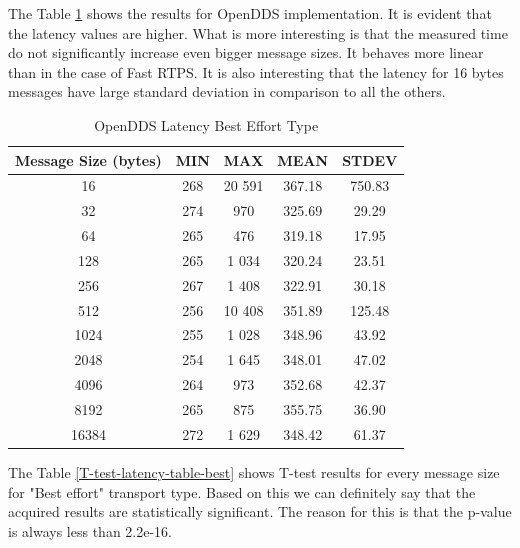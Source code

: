 \documentclass{csfourzero}
\begin{document}
The Table \ref{openDDS-latency-table-best} shows the results for OpenDDS implementation. It is evident that the latency values are higher. What is more interesting is that the measured time do not significantly increase even bigger message sizes. It behaves more linear than in the case of Fast RTPS. It is also interesting that the latency for 16 bytes messages have large standard deviation in comparison to all the others.

\begin{table}[!ht]
	\centering
	\caption{OpenDDS Latency Best Effort Type}
	\label{openDDS-latency-table-best}
	\begin{tabular}{|c|c|c|c|c|}
		\hline 
		Message Size (bytes)& MIN & MAX & MEAN & STDEV \\ 
		\hline 
		16 & 268 & 20 591 & 367.18 & 750.83 \\ 
		\hline 
		32 & 274 & 970 & 325.69 & 29.29 \\ 
		\hline 
		64 & 265 & 476 & 319.18 & 17.95 \\ 
		\hline 
		128 & 265 & 1 034 & 320.24 & 23.51 \\ 
		\hline 
		256 & 267 & 1 408 & 322.91 & 30.18 \\ 
		\hline 
		512 & 256 & 10 408 & 351.89 & 125.48 \\ 
		\hline 
		1024 & 255 & 1 028 & 348.96 & 43.92 \\ 
		\hline 
		2048 & 254 & 1 645 & 348.01 & 47.02 \\ 
		\hline 
		4096 & 264 & 973 & 352.68 & 42.37 \\ 
		\hline 
		8192 & 265 & 875 & 355.75 & 36.90 \\ 
		\hline 
		16384 & 272 & 1 629 & 348.42 & 61.37 \\ 
		\hline 
	\end{tabular}
\end{table}

The Table \ref{T-test-latency-table-best} shows T-test results for every message size for "Best effort" transport type. Based on this we can definitely say that the acquired results are statistically significant. The reason for this is that the p-value is always less than 2.2e-16.
\end{document}
